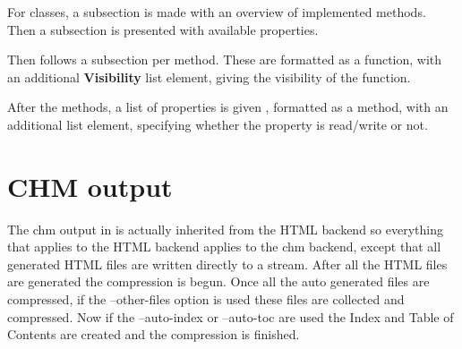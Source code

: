For classes, a subsection is made with an overview of implemented methods.
Then a subsection is presented with available properties. 

Then follows a subsection per method. These are formatted as a function, with an
additional \textbf{Visibility} list element, giving the visibility of the
function.

After the methods, a list of properties is given , formatted as a method,
with an additional  list element, specifying whether the
property is read/write or not.

\section{CHM output}

The chm output in \fpdoc is actually inherited from the HTML backend so 
everything that applies to the HTML backend applies to the chm backend, except
that all generated HTML files are written directly to a stream. After all the
HTML files are generated the compression is begun. Once all the auto generated
files are compressed, if the --other-files option is used these files are 
collected and compressed. Now if the --auto-index or --auto-toc are used
the Index and Table of Contents are created and the compression is finished.



